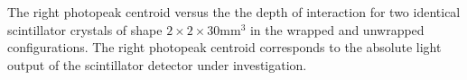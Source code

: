 \label{fig:lightoutput} The right photopeak centroid versus the the depth of interaction for two identical scintillator crystals of shape $2\times2\times30$mm$^3$ in the wrapped and unwrapped configurations. The right photopeak centroid corresponds to the absolute light output of the scintillator detector under investigation.